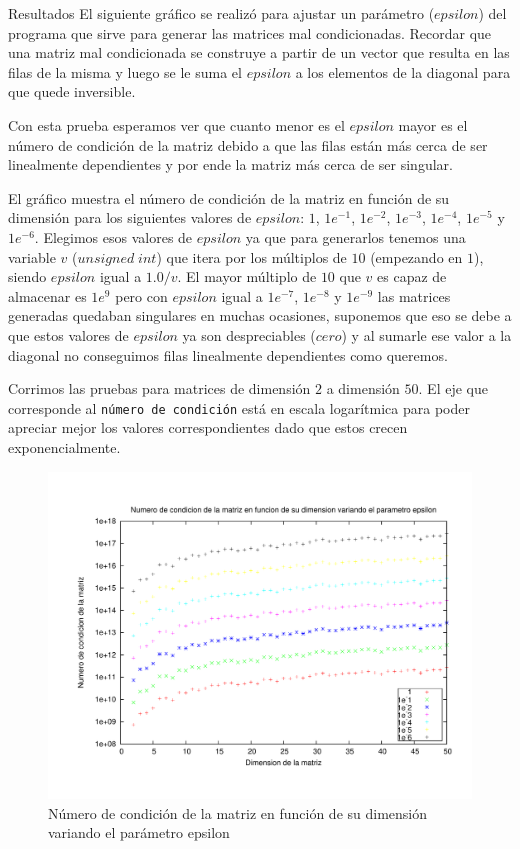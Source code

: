 \begin{section}{Resultados}
	El siguiente gráfico se realizó para ajustar un parámetro ($epsilon$) del programa que sirve para generar las matrices mal condicionadas. Recordar que una matriz mal condicionada se construye a partir de un vector que resulta en las filas de la misma y luego se le suma el $epsilon$ a los elementos de la diagonal para que quede inversible.
	
	Con esta prueba esperamos ver que cuanto menor es el $epsilon$ mayor es el número de condición de la matriz debido a que las filas están más cerca de ser linealmente dependientes y por ende la matriz más cerca de ser singular.

	El gráfico muestra el número de condición de la matriz en función de su dimensión para los siguientes valores de $epsilon$: $1$, $1e^{-1}$, $1e^{-2}$, $1e^{-3}$, $1e^{-4}$, $1e^{-5}$ y $1e^{-6}$. Elegimos esos valores de $epsilon$ ya que para generarlos tenemos una variable $v$ ($unsigned\;int$) que itera por los múltiplos de $10$ (empezando en $1$), siendo $epsilon$ igual a $1.0/v$. El mayor múltiplo de $10$ que $v$ es capaz de almacenar es $1e^9$ pero con $epsilon$ igual a $1e^{-7}$, $1e^{-8}$ y $1e^{-9}$ las matrices generadas quedaban singulares en muchas ocasiones, suponemos que eso se debe a que estos valores de $epsilon$ ya son despreciables ($cero$) y al sumarle ese valor a la diagonal no conseguimos filas linealmente dependientes como queremos.
	
	Corrimos las pruebas para matrices de dimensión $2$ a dimensión $50$.
	El eje que corresponde al \texttt{número de condición} está en escala logarítmica para poder apreciar mejor los valores correspondientes dado que estos crecen exponencialmente.

	\begin{figure}[H]
	  \centering
		\includegraphics[width=14cm]{graficos/ajuste_epsilon.pdf}
	  \caption{Número de condición de la matriz en función de su dimensión variando el parámetro epsilon}
	  \label{fig:epsilon}
	\end{figure}
	

\end{section}
